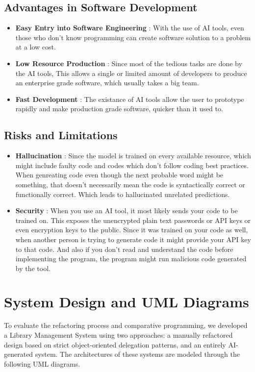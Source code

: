 \documentclass[12pt, a4paper]{article}
\begin{document}
\subsection{Advantages in Software Development}
\begin{itemize}
    \item \textbf{Easy Entry into Software Engineering} : With the use of AI tools, even those who don't know programming can create software solution to a problem at a low cost.
    \item \textbf{Low Resource Production} : Since most of the tedious tasks are done by the AI tools, This allows a single or limited amount of developers to produce an enterprise grade software, which usually takes a big team.
    \item \textbf{Fast Development} : The existance of AI tools allow the user to prototype rapidly and make production grade software, quicker than it used to.
\end{itemize}

\subsection{Risks and Limitations}
\begin{itemize}
    \item \textbf{Hallucination} : Since the model is trained on every available resource, which might include faulty code and codes which don't follow coding best practices. When genreating code even though the next probable word might be something, that doesn't necessarily mean the code is syntactically correct or functionally correct. Which leads to hallucinated unrelated predictions.
    \item \textbf{Security} : When you use an AI tool, it most likely sends your code to be trained on. This exposes the unencrypted plain text passwords or API keys or even encryption keys to the public. Since it was trained on your code as well, when another person is trying to generate code it might provide your API key to that code. And also if you don't read and understand the code before implementing the program, the program might run malicious code generated by the tool.
\end{itemize}

\newpage
\section{System Design and UML Diagrams}
To evaluate the refactoring process and comparative programming, we developed a Library Management System using two approaches: a manually refactored design based on strict object-oriented delegation patterns, and an entirely AI-generated system. The architectures of these systems are modeled through the following UML diagrams.
\end{document}
